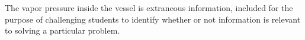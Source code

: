 \vskip 10pt








The vapor pressure inside the vessel is extraneous information, included for the purpose of challenging students to identify whether or not information is relevant to solving a particular problem.




